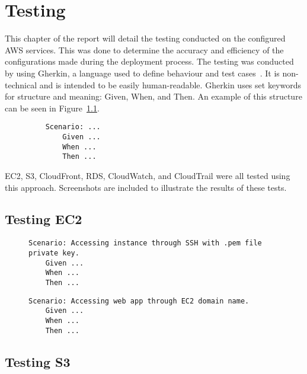 \chapter{Testing}\label{ch:testing}

This chapter of the report will detail the testing conducted on the configured AWS services.
This was done to determine the accuracy and efficiency of the configurations made during the deployment process.
The testing was conducted by using Gherkin, a language used to define behaviour and test
cases~\parencite{dos2018automated}.
It is non-technical and is intended to be easily human-readable.
Gherkin uses set keywords for structure and meaning: Given, When, and Then.
An example of this structure can be seen in Figure~\ref{fig:gherkin}.

\begin{figure}[!htbp]
    \centering
    \begin{verbatim}
    Scenario: ...
        Given ...
        When ...
        Then ...
    \end{verbatim}
    \label{fig:gherkin}
\end{figure}

EC2, S3, CloudFront, RDS, CloudWatch, and CloudTrail were all tested using this approach.
Screenshots are included to illustrate the results of these tests.

\section{Testing EC2}\label{sec:testing-ec2}

\begin{figure}[!htbp]
    \centering
    \begin{verbatim}
Scenario: Accessing instance through SSH with .pem file private key.
    Given ...
    When ...
    Then ...
    \end{verbatim}
    \label{fig:accessing-instance-ec2}
\end{figure}

\begin{figure}[!htbp]
    \centering
    \begin{verbatim}
Scenario: Accessing web app through EC2 domain name.
    Given ...
    When ...
    Then ...
    \end{verbatim}
    \label{fig:accessing-web-app-ec2}
\end{figure}

\section{Testing S3}\label{sec:testing-s3}

